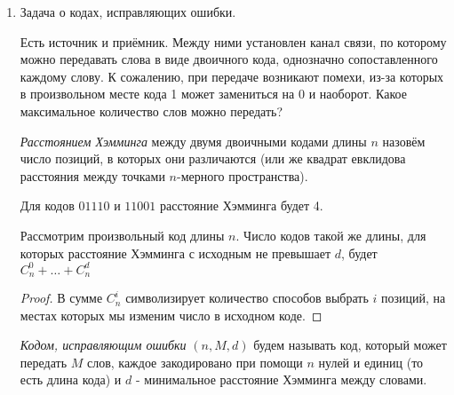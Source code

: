\begin{enumerate}
	\begin{corollary}
		Если $s = n$ (уже не обязательно порядок матрицы Адамара), то $\disc(\mathcal{M}) \ge (1 - \eps_n) \frac{\sqrt{n}}{2}$, где $\eps_n \to 0$ при $n \to \infty$
	\end{corollary}

	\begin{theorem} (без доказательства)
		Если $s = n$, то
		\[
			\forall \mathcal{M}\ \disc(\mathcal{M}) \le 6\sqrt{n}
		\]
	\end{theorem}
	
	\item Задача о кодах, исправляющих ошибки.
	
	Есть источник и приёмник. Между ними установлен канал связи, по которому можно передавать слова в виде двоичного кода, однозначно сопоставленного каждому слову. К сожалению, при передаче возникают помехи, из-за которых в произвольном месте кода 1 может замениться на 0 и наоборот. Какое максимальное количество слов можно передать?
	
	\begin{definition}
		\textit{Расстоянием Хэмминга} между двумя двоичными кодами длины $n$ назовём число позиций, в которых они различаются (или же квадрат евклидова расстояния между точками $n$-мерного пространства).
	\end{definition}
	
	\begin{example}
		Для кодов $01110$ и $11001$ расстояние Хэмминга будет 4.
	\end{example}

	\begin{proposition}
		Рассмотрим произвольный код длины $n$. Число кодов такой же длины, для которых расстояние Хэмминга с исходным не превышает $d$, будет $C_n^0 + \ldots + C_n^d$
	\end{proposition}


	\begin{proof}
		В сумме $C_n^i$ символизирует количество способов выбрать $i$ позиций, на местах которых мы изменим число в исходном коде.
	\end{proof}

	\begin{definition}
		\textit{Кодом, исправляющим ошибки} $(n, M, d)$ будем называть код, который может передать $M$ слов, каждое закодировано при помощи $n$ нулей и единиц (то есть длина кода) и $d$ - минимальное расстояние Хэмминга между словами.
	\end{definition}


\end{enumerate}
